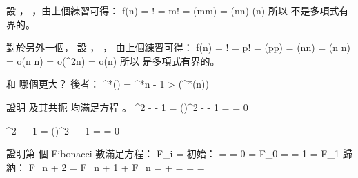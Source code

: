 設 ， ，由上個練習可得：
\startformula\startalign
 \NC \lg f(n) \NC = \lg \lceil{}\rceil ! \NR
 \NC          \NC = \lg m! \NR
 \NC          \NC = \Theta(m\lg m) \NR
 \NC          \NC = \Theta(\lceil\lg n\rceil \lg \lceil \lg n\rceil) \NR
 \NC          \NC \neq \Theta(\lg n) \NR
\stopalign\stopformula
所以  {\EMP 不是}多項式有界的。

對於另外一個，
設 ， ，
由上個練習可得：
\startformula\startalign
 \NC \lg f(n) \NC = \lg \lceil{}\rceil ! \NR
 \NC          \NC = \lg p! \NR
 \NC          \NC = \Theta(p\lg p) \NR
 \NC          \NC = \Theta(\lceil\lg\lg n\rceil \lg \lceil \lg\lg n\rceil) \NR
 \NC          \NC = \Theta(\lg\lg n \lg\lg\lg n) \NR
 \NC          \NC = o(\lg\lg n \lg\lg n) \NR
 \NC          \NC = o(\lg^2\lg n) \NR
 \NC          \NC = o(\lg n) \NR
\stopalign\stopformula
所以  {\EMP 是}多項式有界的。
\stopANSWER

\startEXERCISE
{} 和  哪個更大？
\stopEXERCISE
\startANSWER
後者：
\startformula
\lg^*() = \lg^*n - 1 > \lg(\lg^*(n))
\stopformula
\stopANSWER

\startEXERCISE
證明 \m{\phi} 及其共扼 \m{\hat \phi} 均滿足方程 。
\stopEXERCISE
\startANSWER
\startformula\startalign
 \NC \phi^2 - \phi - 1 \NC = ()^2 -  - 1 \NR
 \NC                   \NC =  \NR
 \NC                   \NC = 0 \NR
\stopalign\stopformula

\startformula\startalign
 \NC \hat\phi^2 - \hat\phi - 1 \NC = ()^2 -  - 1 \NR
 \NC                           \NC =  \NR
 \NC                           \NC = 0 \NR
\stopalign\stopformula
\stopANSWER

\startEXERCISE
證明第  個 Fibonacci 數滿足方程：
\startformula
F_i = 
\stopformula
\stopEXERCISE
\startANSWER
初始：
\startformula\startalign
{} =  = 0 = F_0 \NR
{} =  = 1 = F_1 \NR
\stopalign\stopformula
歸納：
\startformula\startalign
 \NC F_{n + 2} \NC = F_{n + 1} + F_n \NR
 \NC           \NC =  +  \NR
 \NC           \NC =  \NR
 \NC           \NC =  \NR
 \NC           \NC =  \NR
\stopalign\stopformula
\stopANSWER

